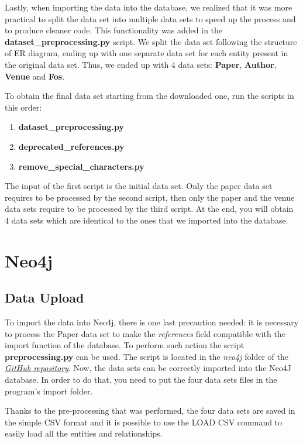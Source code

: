 \documentclass{Configuration_Files/PoliMi3i_thesis}
\begin{document}
Lastly, when importing the data into the database, we realized that it was more practical to split the data set into multiple data sets to speed up the process and to produce cleaner code.  This functionality was added in the \textbf{dataset\_preprocessing.py} script. We split the data set following the structure of ER diagram, ending up with one separate data set for each entity present in the original data set. Thus, we ended up with 4 data sets: \textbf{Paper}, \textbf{Author}, \textbf{Venue} and \textbf{Fos}.

To obtain the final data set starting from the downloaded one, run the scripts in this order:

\begin{enumerate}
    \item \textbf{dataset\_preprocessing.py}
    \item \textbf{deprecated\_references.py}
    \item \textbf{remove\_special\_characters.py}
\end{enumerate}

The input of the first script is the initial data set. Only the paper data set requires to be processed by the second script, then only the paper and the venue data sets require to be processed by the third script. 
At the end, you will obtain 4 data sets which are identical to the ones that we imported into the database.

\chapter{Neo4j}
\label{ch:neo}
\section{Data Upload}
To import the data into Neo4j, there is one last precaution needed: it is necessary to process the Paper data set to make the \textit{references} field compatible with the import function of the database. To perform such action the script \textbf{preprocessing.py} can be used. The script is located in the \textit{neo4j} folder of the \href{https://github.com/albertopirillo/smbud-project-2022}{\textit{GitHub repository}}.
Now, the data sets can be correctly imported into the Neo4J database. In order to do that, you need to put the four data sets files in the program's import folder. 

Thanks to the pre-processing that was performed, the four data sets are saved in the simple CSV format and it is possible to use the LOAD CSV command to easily load all the entities and relationships.
\end{document}
